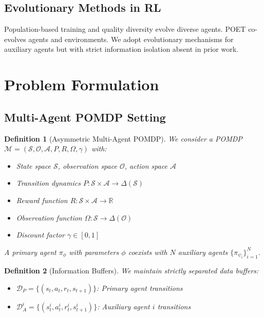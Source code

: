 \documentclass[12pt, a4paper]{article}
\newtheorem{definition}{Definition}
\begin{document}
\subsection{Evolutionary Methods in RL}
Population-based training \cite{jaderberg2017population} and quality diversity \cite{pugh2016quality} evolve diverse agents. POET \cite{wang2019paired} co-evolves agents and environments. We adopt evolutionary mechanisms for auxiliary agents but with strict information isolation absent in prior work.

\section{Problem Formulation}

\subsection{Multi-Agent POMDP Setting}

\begin{definition}[Asymmetric Multi-Agent POMDP]
We consider a POMDP $\mathcal{M} = (\mathcal{S}, \mathcal{O}, \mathcal{A}, P, R, \Omega, \gamma)$ with:
\begin{itemize}
\item State space $\mathcal{S}$, observation space $\mathcal{O}$, action space $\mathcal{A}$
\item Transition dynamics $P: \mathcal{S} \times \mathcal{A} \rightarrow \Delta(\mathcal{S})$
\item Reward function $R: \mathcal{S} \times \mathcal{A} \rightarrow \mathbb{R}$
\item Observation function $\Omega: \mathcal{S} \rightarrow \Delta(\mathcal{O})$
\item Discount factor $\gamma \in [0,1]$
\end{itemize}
A primary agent $\pi_\phi$ with parameters $\phi$ coexists with $N$ auxiliary agents $\{\pi_{\psi_i}\}_{i=1}^N$.
\end{definition}

\begin{definition}[Information Buffers]
We maintain strictly separated data buffers:
\begin{itemize}
\item $\mathcal{D}_P = \{(s_t, a_t, r_t, s_{t+1})\}$: Primary agent transitions
\item $\mathcal{D}_A^i = \{(s_t^i, a_t^i, r_t^i, s_{t+1}^i)\}$: Auxiliary agent $i$ transitions
\end{itemize}
\end{definition}
\end{document}
